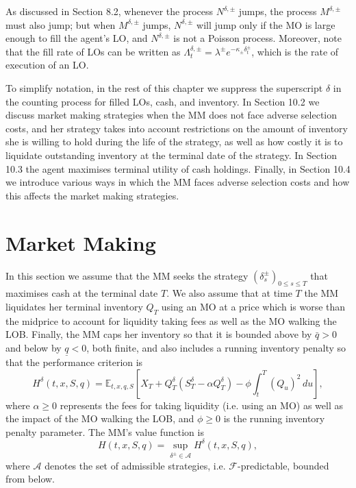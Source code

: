 \documentclass[11pt, a4paper]{book}
\newcommand{\E}{\mathbb{E}}
\begin{document}
	As discussed in Section 8.2, whenever the process $N^{\delta, \pm}$ jumps, the process $M^{\delta, \pm}$ must also jump; but when $M^{\delta, \pm}$ jumps, $N^{\delta, \pm}$ will jump only if the MO is large enough to fill the agent's LO, and $N^{\delta, \pm}$ is not a Poisson process. Moreover, note that the fill rate of LOs can be written as $\Lambda^{\delta, \pm}_t = \lambda^\pm e^{-\kappa_\pm \delta^\pm_t}$, which is the rate of execution of an LO.
	
	To simplify notation, in the rest of this chapter we suppress the superscript $\delta$ in the counting process for filled LOs, cash, and inventory. In Section 10.2 we discuss market making strategies when the MM does not face adverse selection costs, and her strategy takes into account restrictions on the amount of inventory she is willing to hold during the life of the strategy, as well as how costly it is to liquidate outstanding inventory at the terminal date of the strategy. In Section 10.3 the agent maximises terminal utility of cash holdings. Finally, in Section 10.4 we introduce various ways in which the MM faces adverse selection costs and how this affects the market making strategies.
	
	\section{Market Making}
	
	In this section we assume that the MM seeks the strategy $(\delta^\pm_s)_{0 \leq s \leq T}$ that maximises cash at the terminal date $T$. We also assume that at time $T$ the MM liquidates her terminal inventory $Q_T$ using an MO at a price which is worse than the midprice to account for liquidity taking fees as well as the MO walking the LOB. Finally, the MM caps her inventory so that it is bounded above by $\bar{q} > 0$ and below by $\underline{q} < 0$, both finite, and also includes a running inventory penalty so that the performance criterion is
	\[
	H^\delta(t, x, S, q) = \E_{t,x,q,S} \left[ X_T + Q^\delta_T (S^\delta_T - \alpha Q^\delta_T) - \phi \int_t^T (Q_u)^2 \, du \right],
	\]
	where $\alpha \geq 0$ represents the fees for taking liquidity (i.e. using an MO) as well as the impact of the MO walking the LOB, and $\phi \geq 0$ is the running inventory penalty parameter. The MM's value function is
	\begin{equation}
		H(t, x, S, q) = \sup_{\delta^\pm \in \mathcal{A}} H^\delta(t, x, S, q), \label{eq:10.3}
	\end{equation}
	where $\mathcal{A}$ denotes the set of admissible strategies, i.e. $\mathcal{F}$-predictable, bounded from below.
	
\end{document}
